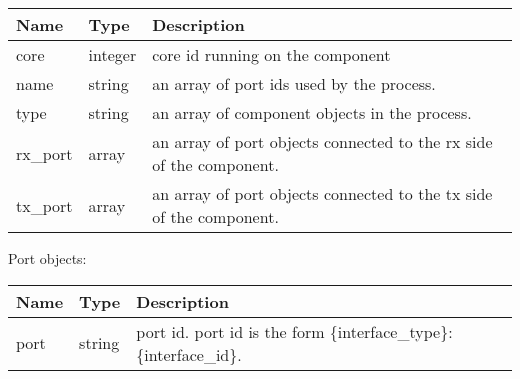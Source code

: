 \documentclass[a4paper,11pt,openany,oneside,english]{sphinxmanual}
\begin{document}
\begin{savenotes}\sphinxattablestart
\centering
{}
\sphinxthecaptionisattop
{}\label{\detokenize{api_ref/spp_mirror:id16}}\label{\detokenize{api_ref/spp_mirror:table-spp-ctl-spp-mirror-res-comp}}
\sphinxaftertopcaption
\begin{tabulary}{\linewidth}[t]{|T|T|T|}
\hline
\sphinxstyletheadfamily 
Name
&\sphinxstyletheadfamily 
Type
&\sphinxstyletheadfamily 
Description
\\
\hline
core
&
integer
&
core id running on the component
\\
\hline
name
&
string
&
an array of port ids used by the process.
\\
\hline
type
&
string
&
an array of component objects in the process.
\\
\hline
rx\_port
&
array
&
an array of port objects connected to the rx side of the component.
\\
\hline
tx\_port
&
array
&
an array of port objects connected to the tx side of the component.
\\
\hline
\end{tabulary}
\par
\sphinxattableend\end{savenotes}

Port objects:


\begin{savenotes}\sphinxattablestart
\centering
{}
\sphinxthecaptionisattop
{}\label{\detokenize{api_ref/spp_mirror:id17}}\label{\detokenize{api_ref/spp_mirror:table-spp-ctl-spp-mirror-res-port}}
\sphinxaftertopcaption
\begin{tabulary}{\linewidth}[t]{|T|T|T|}
\hline
\sphinxstyletheadfamily 
Name
&\sphinxstyletheadfamily 
Type
&\sphinxstyletheadfamily 
Description
\\
\hline
port
&
string
&
port id. port id is the form \{interface\_type\}:\{interface\_id\}.
\\
\hline
\end{tabulary}
\par
\sphinxattableend\end{savenotes}
\end{document}
